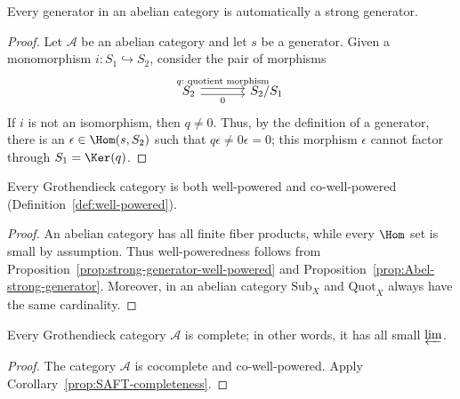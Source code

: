 \begin{proposition}\label{prop:Abel-strong-generator}
Every generator in an abelian category is automatically a strong generator.
\end{proposition}
\begin{proof}
Let $\mathcal{A}$ be an abelian category and let $s$ be a generator. Given a
monomorphism $i:S_1\hookrightarrow S_2$, consider the pair of morphisms
\[\begin{tikzcd}[column sep=large]
	S_2\arrow[shift left,r,"q:\text{ quotient morphism}"]
	\arrow[shift right,r,"0"']&S_2/S_1
\end{tikzcd}\]
If $i$ is not an isomorphism, then $q\neq0$. Thus, by the definition of a
generator, there is an $\epsilon\in\Hom(s,S_2)$ such that
$q\epsilon\neq0\epsilon=0$; this morphism $\epsilon$ cannot factor through
$S_1=\Ker(q)$.
\end{proof}

\begin{corollary}\label{prop:Grothendieck-cat-wellpowered}
Every Grothendieck category is both well-powered and co-well-powered
(Definition~\ref{def:well-powered}).
\end{corollary}
\begin{proof}
An abelian category has all finite fiber products, while every $\Hom$ set is
small by assumption. Thus well-poweredness follows from
Proposition~\ref{prop:strong-generator-well-powered} and
Proposition~\ref{prop:Abel-strong-generator}. Moreover, in an abelian category
$\mathrm{Sub}_X$ and $\mathrm{Quot}_X$ always have the same cardinality.
\end{proof}

\begin{corollary}\label{prop:Grothendieck-cat-complete}
Every Grothendieck category $\mathcal{A}$ is complete; in other words, it has
all small $\varprojlim$.
\end{corollary}
\begin{proof}
The category $\mathcal{A}$ is cocomplete and co-well-powered. Apply
Corollary~\ref{prop:SAFT-completeness}.
\end{proof}


